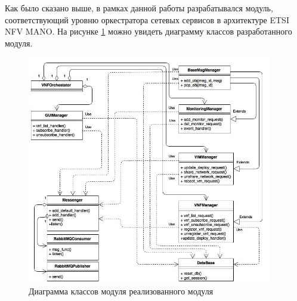 \documentclass[oneside,final,14pt,a4paper]{extreport}
\begin{document}
Как было сказано выше, в рамках данной работы разрабатывался модуль, соответствующий уровню оркестратора сетевых сервисов в архитектуре ETSI NFV MANO. 
На рисунке \ref{pic:classes_diagram} можно увидеть диаграмму классов разработанного модуля.
\begin{figure}[h]
	\centering
	\includegraphics[width=0.95\textwidth]{classes_diagram}
	\caption{Диаграмма классов модуля реализованного модуля}
	\label{pic:classes_diagram}
\end{figure}
\end{document}
